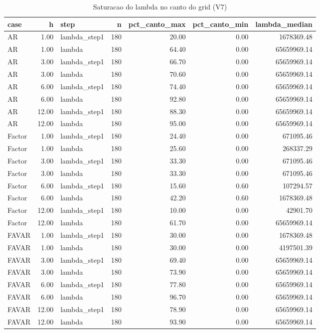 \begin{table}[ht]
\centering
\begin{tabular}{lrlrrrr}
  \hline
case & h & step & n & pct\_canto\_max & pct\_canto\_min & lambda\_median \\ 
  \hline
AR & 1.00 & lambda\_step1 & 180 & 20.00 & 0.00 & 1678369.48 \\ 
  AR & 1.00 & lambda & 180 & 64.40 & 0.00 & 65659969.14 \\ 
  AR & 3.00 & lambda\_step1 & 180 & 66.70 & 0.00 & 65659969.14 \\ 
  AR & 3.00 & lambda & 180 & 70.60 & 0.00 & 65659969.14 \\ 
  AR & 6.00 & lambda\_step1 & 180 & 74.40 & 0.00 & 65659969.14 \\ 
  AR & 6.00 & lambda & 180 & 92.80 & 0.00 & 65659969.14 \\ 
  AR & 12.00 & lambda\_step1 & 180 & 88.30 & 0.00 & 65659969.14 \\ 
  AR & 12.00 & lambda & 180 & 95.00 & 0.00 & 65659969.14 \\ 
  Factor & 1.00 & lambda\_step1 & 180 & 24.40 & 0.00 & 671095.46 \\ 
  Factor & 1.00 & lambda & 180 & 25.60 & 0.00 & 268337.29 \\ 
  Factor & 3.00 & lambda\_step1 & 180 & 33.30 & 0.00 & 671095.46 \\ 
  Factor & 3.00 & lambda & 180 & 33.30 & 0.00 & 671095.46 \\ 
  Factor & 6.00 & lambda\_step1 & 180 & 15.60 & 0.60 & 107294.57 \\ 
  Factor & 6.00 & lambda & 180 & 42.20 & 0.60 & 1678369.48 \\ 
  Factor & 12.00 & lambda\_step1 & 180 & 10.00 & 0.00 & 42901.70 \\ 
  Factor & 12.00 & lambda & 180 & 61.70 & 0.00 & 65659969.14 \\ 
  FAVAR & 1.00 & lambda\_step1 & 180 & 30.00 & 0.00 & 1678369.48 \\ 
  FAVAR & 1.00 & lambda & 180 & 30.00 & 0.00 & 4197501.39 \\ 
  FAVAR & 3.00 & lambda\_step1 & 180 & 69.40 & 0.00 & 65659969.14 \\ 
  FAVAR & 3.00 & lambda & 180 & 73.90 & 0.00 & 65659969.14 \\ 
  FAVAR & 6.00 & lambda\_step1 & 180 & 77.80 & 0.00 & 65659969.14 \\ 
  FAVAR & 6.00 & lambda & 180 & 96.70 & 0.00 & 65659969.14 \\ 
  FAVAR & 12.00 & lambda\_step1 & 180 & 78.90 & 0.00 & 65659969.14 \\ 
  FAVAR & 12.00 & lambda & 180 & 93.90 & 0.00 & 65659969.14 \\ 
   \hline
\end{tabular}
\caption{Saturacao do lambda no canto do grid (V7)} 
\label{tab:lambda_saturacao}
\end{table}
